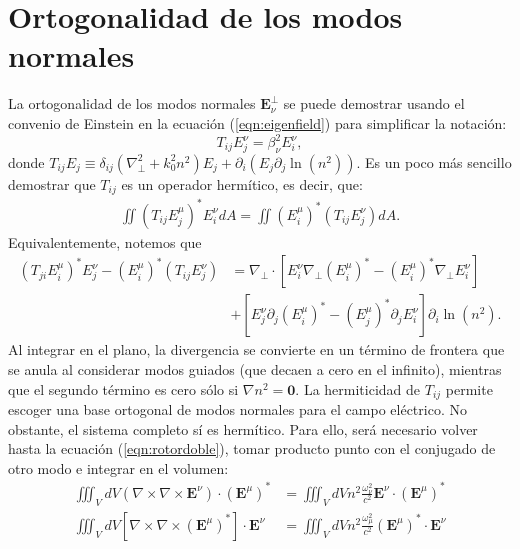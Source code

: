 \chapter{Ortogonalidad de los modos normales \label{sec:orto}}

La ortogonalidad de los modos normales $\textbf{E}_\nu^\perp$ se puede demostrar usando el convenio de Einstein en la ecuación (\ref{eqn:eigenfield}) para simplificar la notación:
\begin{equation}
	T_{ij} E^\nu_j = \beta_\nu^2 E^\nu_i, \label{eqn:eigentensorial}
\end{equation}
donde $T_{ij}E_j \equiv \delta_{ij}\left(\nabla_\perp^2 + k_0^2n^2\right)E_j+\partial_i \left(E_j  \partial_j\ln(n^2) \right) $. Es un poco más sencillo demostrar que $T_{ij}$ es un operador hermítico, es decir, que:
\begin{align*}
	\iint \left(T_{ij} E_j^\mu \right)^*  E_i^\nu dA = \iint \left( E_i^\mu \right)^*  \left(T_{ij} E_j^\nu\right) dA .
\end{align*}
Equivalentemente, notemos que
\begin{align*}
	\left(T_{ji} E_i^\mu \right)^* E_j^\nu  - \left( E_i^\mu \right)^*  \left(T_{ij} E_j^\nu \right) &= \nabla_\perp \cdot \left[E_i^\nu \nabla_\perp \left( E_i^\mu \right)^* - \left( E_i^\mu \right)^* \nabla_\perp E_i^\nu \right] 
	\\	
	&+ \left[E^\nu_j \partial_j \left( E_i^\mu \right)^*  - \left( E_j^\mu \right)^* \partial_j  E_i^\nu \right] \partial_i \ln(n^2).  
\end{align*}
Al integrar en el plano, la divergencia se convierte en un término de frontera que se anula al considerar modos guiados (que decaen a cero en el infinito), mientras que el segundo término es cero sólo si $\nabla n^2 = \textbf{0}$. La hermiticidad de $T_{ij}$ permite escoger una base ortogonal de modos normales para el campo eléctrico. No obstante, el sistema completo sí es hermítico. Para ello, será necesario volver hasta la ecuación (\ref{eqn:rotordoble}), tomar producto punto con el conjugado de otro modo e integrar en el volumen:
\begin{align*}
	\iiint_V dV \left(\nabla\times\nabla\times\textbf{E}^\nu \right)  \cdot \left(\textbf{E}^\mu\right)^* &= \iiint_V dV n^2\frac{\omega_\nu^2}{c^2} \textbf{E}^\nu \cdot \left(\textbf{E}^\mu\right)^*
	\\
	\iiint_V dV \left[\nabla\times\nabla\times\left(\textbf{E}^\mu\right)^* \right]  \cdot \textbf{E}^\nu &= \iiint_V dV n^2 \frac{\omega_\mu^2}{c^2} \left(\textbf{E}^\mu\right)^* \cdot \textbf{E}^\nu  
\end{align*}
